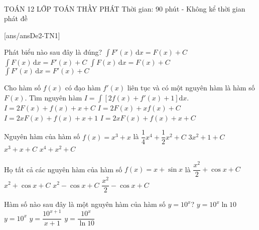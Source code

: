 ﻿﻿\begin{name}
	{\tenchude}
	{TOÁN 12}
	{LỚP TOÁN THẦY PHÁT}
	{Thời gian: 90 phút - Không kể thời gian phát đề}
\end{name}
\TN
{}[ans/ansDe2-TN1]
\begin{ex}%
	Phát biểu nào sau đây là đúng?
	\choice
	{\True $\displaystyle\int\limits F'(x)\mathrm{\,d}x=F(x)+C$}
	{$\displaystyle\int\limits F(x)\mathrm{\,d}x=F'(x)+C$}
	{$\displaystyle\int\limits F(x)\mathrm{\,d}x=F(x)+C$}
	{$\displaystyle\int\limits F'(x)\mathrm{\,d}x=F'(x)+C$}
\end{ex}

\begin{ex}%
	Cho hàm số $ f(x) $ có đạo hàm $ f'(x) $ liên tục và có một nguyên hàm là hàm số $ F(x) $. Tìm nguyên hàm $ I=\displaystyle\int \left[2f(x)+f'(x)+1\right]\mathrm{d}x $.
	\choice
	{\True $ I=2F(x)+f(x)+x+C $}
	{$ I=2F(x)+xf(x)+C $}
	{$ I=2xF(x)+f(x)+x+1 $}
	{$ I=2xF(x)+f(x)+x+C $}
\end{ex}

\begin{ex}%
	Nguyên hàm của hàm số $f(x)=x^3+x$ là
	\choice
	{\True $\dfrac{1}{4}x^4+\dfrac{1}{2}x^2+C$}
	{$3x^2+1+C$}
	{$x^3+x+C$}
	{$x^4+x^2+C$}
\end{ex}

\begin{ex}%
	Họ tất cả các nguyên hàm của hàm số $f(x)=x+\sin x$ là
	\choice
	{$\dfrac{x^2}{2}+\cos x+C$}
	{$x^2+\cos x+C$}
	{$x^2-\cos x+C$}
	{\True $\dfrac{x^2}{2}-\cos x+C$}
\end{ex}

\begin{ex}%
	Hàm số nào sau đây là một nguyên hàm của hàm số $y=10^x$?
	\choice
	{$y=10^x \ln 10$}
	{$y=10^x$}
	{$y=\dfrac{10^{x+1}}{x+1}$}
	{\True $y=\dfrac{10^x}{\ln 10}$}
\end{ex}

